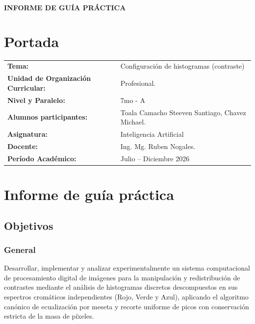 \documentclass{article}
\begin{document}
\begin{center}
    {\large \textbf{INFORME DE GUÍA PRÁCTICA}} \\
\end{center}


\section{Portada}
\begin{flushleft}
\begin{tabular}{ l l }
    \textbf{Tema:} & Configuración de histogramas (contraste)\\
    \textbf{Unidad de Organización Curricular:} & Profesional. \\
    \textbf{Nivel y Paralelo:} & 7mo - A \\
    \textbf{Alumnos participantes:} & Toala Camacho Steeven Santiago, Chavez Michael. \\
    \textbf{Asignatura:} & Inteligencia Artificial\\
    \textbf{Docente:} & Ing. Mg. Ruben Nogales. \\
    \textbf{Per\'iodo Acad\'emico:} & Julio -- Diciembre 2026 \\
\end{tabular}
\end{flushleft}


\section{Informe de guía práctica}

\subsection{Objetivos}

\subsubsection{General}
Desarrollar, implementar y analizar experimentalmente un sistema computacional de procesamiento digital de imágenes para la manipulación y redistribución de contrastes mediante el análisis de histogramas discretos descompuestos en sus espectros cromáticos independientes (Rojo, Verde y Azul), aplicando el algoritmo canónico de ecualización por meseta y recorte uniforme de picos con conservación estricta de la masa de píxeles.
\end{document}
